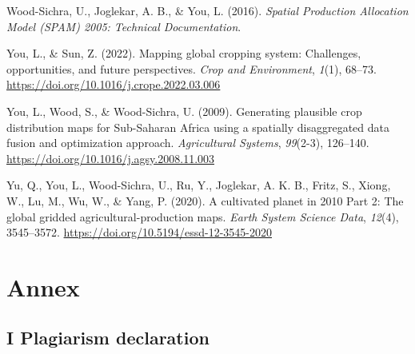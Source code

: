 \documentclass[
  letterpaper,
  DIV=11,
  numbers=noendperiod]{scrreprt}
\newlength{\cslhangindent}
\newlength{\cslentryspacingunit} %
\newenvironment{CSLReferences}[2] %
 {%
  \setlength{\parindent}{0pt}
  \ifodd #1
  \let\oldpar\par
  \def\par{\hangindent=\cslhangindent\oldpar}
  \fi
  \setlength{\parskip}{#2\cslentryspacingunit}
 }%
 {}
\begin{document}
\begin{CSLReferences}{1}{0}
\leavevmode{}%
Wood-Sichra, U., Joglekar, A. B., \& You, L. (2016). \emph{Spatial
{Production Allocation Model} ({SPAM}) 2005: {Technical Documentation}}.

\leavevmode{}%
You, L., \& Sun, Z. (2022). Mapping global cropping system:
{Challenges}, opportunities, and future perspectives. \emph{Crop and
Environment}, \emph{1}(1), 68--73.
\url{https://doi.org/10.1016/j.crope.2022.03.006}

\leavevmode{}%
You, L., Wood, S., \& Wood-Sichra, U. (2009). Generating plausible crop
distribution maps for {Sub-Saharan Africa} using a spatially
disaggregated data fusion and optimization approach. \emph{Agricultural
Systems}, \emph{99}(2-3), 126--140.
\url{https://doi.org/10.1016/j.agsy.2008.11.003}

\leavevmode{}%
Yu, Q., You, L., Wood-Sichra, U., Ru, Y., Joglekar, A. K. B., Fritz, S.,
Xiong, W., Lu, M., Wu, W., \& Yang, P. (2020). A cultivated planet in
2010 \textendash{} {Part} 2: {The} global gridded
agricultural-production maps. \emph{Earth System Science Data},
\emph{12}(4), 3545--3572.
\url{https://doi.org/10.5194/essd-12-3545-2020}

\end{CSLReferences}

\listoffigures

\listoftables


\hypertarget{annex}{%
\chapter*{Annex}\label{annex}}


\hypertarget{sec-annex_i}{%
\section*{\texorpdfstring{\textsc{I} Plagiarism
declaration}{ Plagiarism declaration}}\label{sec-annex_i}}


\color{white}
\end{document}
